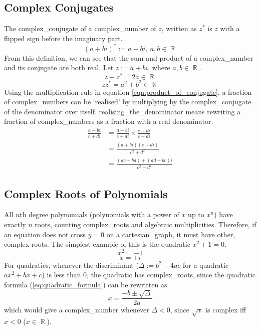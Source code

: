 \documentclass{book}
\DeclareMathOperator{\R}{\mathbb{R}}
\begin{document}
        \subsection{Complex Conjugates}
            The \gls{complex_conjugate} of a \gls{complex_number} of $z$, written as $z^*$ is $z$ with a flipped sign before the imaginary part.
            \begin{equation}
                (a+bi)^*:=a-bi,\ a,b\in\R
            \end{equation}
            From this definition, we can see that the sum and product of a \gls{complex_number} and its conjugate are both real.
            Let $z:=a+bi$, where $a,b\in\R$.
            \begin{equation} \label{eqn:sum_of_conjugate}
                z+z^*=2a\in\R
            \end{equation}
            \begin{equation} \label{eqn:product_of_conjugate}
                zz^*=a^2+b^2\in\R
            \end{equation}
            Using the multiplication rule in equation \ref{eqn:product_of_conjugate}, a fraction of \glspl{complex_number} can be `realised' by multiplying by the \gls{complex_conjugate} of the denominator over itself.
            \Gls{realising_the_denominator} means rewriting a fraction of \glspl{complex_number} as a fraction with a real denominator.
            \begin{equation} \label{eqn:realise_denominator}
            \begin{split}
                \frac{a+bi}{c+di}&=\frac{a+bi}{c+di}\times\frac{c-di}{c-di}\\
                &=\frac{(a+bi)(c+di)}{c^2+d^2}\\
                &=\frac{(ac-bd)+(ad+bc)i}{c^2+d^2}
            \end{split}
            \end{equation}
        \subsection{Complex Roots of Polynomials}
            All $n$th degree \glspl{polynomial} (\glspl{polynomial} with a power of $x$ up to $x^n$) have exactly $n$ \glspl{root}, counting \glspl{complex_root} and algebraic multiplicities.
            Therefore, if an equation does not cross $y=0$ on a \gls{cartesian_graph}, it must have other, complex \glspl{root}.
            The simplest example of this is the \gls{quadratic} $x^2+1=0$.
            \[x^2=-1\]
            \[x=\pm i\]
            For \glspl{quadratic}, whenever the discriminant ($\Delta:=b^2-4ac$ for a \gls{quadratic} $ax^2+bx+c$) is less than $0$, the \gls{quadratic} has \glspl{complex_root}, since the quadratic formula (\ref{eq:quadratic_formula}) can be rewritten as
            \[x=\frac{-b\pm\sqrt{\Delta}}{2a}\]
            which would give a \gls{complex_number} whenever $\Delta<0$, since $\sqrt{x}$ is complex iff $x<0$ ($x\in\R$).
            
\end{document}
